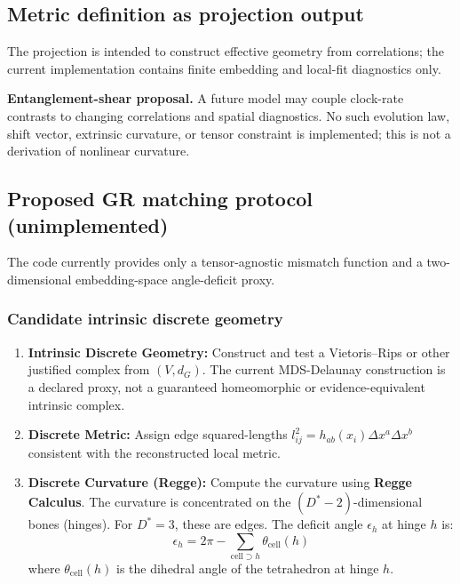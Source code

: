 \documentclass[reprint, amsmath, amssymb, aps, prd]{revtex4-2}
\begin{document}
\subsection{Metric definition as projection output}
The projection is intended to construct effective geometry from correlations; the current implementation contains finite embedding and local-fit diagnostics only.

\textbf{Entanglement-shear proposal.} A future model may couple clock-rate contrasts to changing correlations and spatial diagnostics. No such evolution law, shift vector, extrinsic curvature, or tensor constraint is implemented; this is not a derivation of nonlinear curvature.

\subsection{Proposed GR matching protocol (unimplemented)}
The code currently provides only a tensor-agnostic mismatch function and a two-dimensional embedding-space angle-deficit proxy.

\subsubsection{Candidate intrinsic discrete geometry}
\begin{enumerate}
\item \textbf{Intrinsic Discrete Geometry:} Construct and test a Vietoris--Rips or other justified complex from $(V,d_G)$. The current MDS-Delaunay construction is a declared proxy, not a guaranteed homeomorphic or evidence-equivalent intrinsic complex.

\item \textbf{Discrete Metric:} Assign edge squared-lengths $l_{ij}^2 = h_{ab}(x_i) \Delta x^a \Delta x^b$ consistent with the reconstructed local metric.

\item \textbf{Discrete Curvature (Regge):} Compute the curvature using \textbf{Regge Calculus}. The curvature is concentrated on the $(D^*-2)$-dimensional bones (hinges). For $D^*=3$, these are edges. The deficit angle $\epsilon_h$ at hinge $h$ is:
\begin{equation}
\epsilon_h = 2\pi - \sum_{\text{cell} \supset h} \theta_{\text{cell}}(h)
\end{equation}
where $\theta_{\text{cell}}(h)$ is the dihedral angle of the tetrahedron at hinge $h$.
\end{enumerate}
\end{document}
